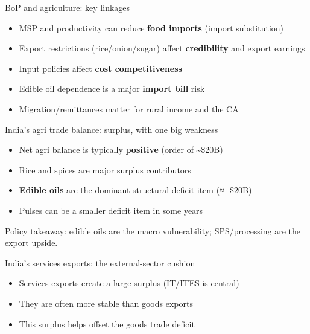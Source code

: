 \documentclass[
  ignorenonframetext,
  aspectratio=169,
]{beamer}
\makeatletter
\providecommand{\tightlist}{%
  \setlength{\itemsep}{0pt}\setlength{\parskip}{0pt}}
\let\quarto@originallabel\label
\DeclareRobustCommand*{\label}[1]{\quarto@originallabel{#1}}
\makeatother
\begin{document}
\begin{frame}{BoP and agriculture: key linkages}
\label{bop-and-agriculture-key-linkages}
\begin{itemize}
\tightlist
\item
  MSP and productivity can reduce \textbf{food imports} (import
  substitution)
\item
  Export restrictions (rice/onion/sugar) affect \textbf{credibility} and
  export earnings
\item
  Input policies affect \textbf{cost competitiveness}
\item
  Edible oil dependence is a major \textbf{import bill} risk
\item
  Migration/remittances matter for rural income and the CA
\end{itemize}
\end{frame}

\begin{frame}{India's agri trade balance: surplus, with one big
weakness}
\label{indias-agri-trade-balance-surplus-with-one-big-weakness}
\begin{itemize}
\tightlist
\item
  Net agri balance is typically \textbf{positive} (order of
  \textasciitilde\$20B)
\item
  Rice and spices are major surplus contributors
\item
  \textbf{Edible oils} are the dominant structural deficit item (≈
  -\$20B)
\item
  Pulses can be a smaller deficit item in some years
\end{itemize}

Policy takeaway: edible oils are the macro vulnerability; SPS/processing
are the export upside.
\end{frame}

\begin{frame}{India's services exports: the external-sector cushion}
\label{indias-services-exports-the-external-sector-cushion}
\begin{itemize}
\tightlist
\item
  Services exports create a large surplus (IT/ITES is central)
\item
  They are often more stable than goods exports
\item
  This surplus helps offset the goods trade deficit
\end{itemize}
\end{frame}
\end{document}
